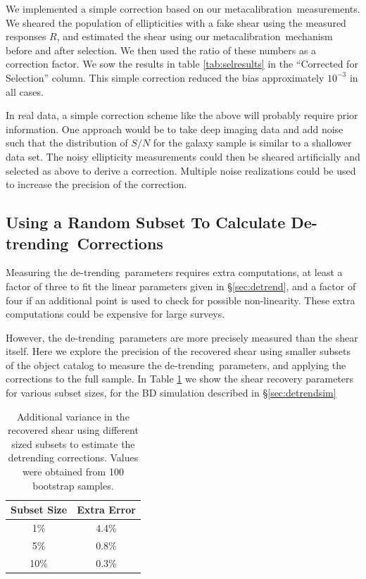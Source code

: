 \documentclass[usegraphicx,usenatbib]{mn2e}
\newcommand{\mcal}{metacalibration}
\newcommand{\mcalR}{$R$}
\newcommand{\detrend}{de-trending}
\newcommand{\Detrend}{De-trending}
\begin{document}
We implemented a simple correction based on our \mcal\ measurements.  We
sheared the population of ellipticities with a fake shear using the measured
responses \mcalR, and estimated the shear using our \mcal\ mechanism before and
after selection.  We then used the ratio of these numbers as a correction
factor.  We sow the results in table \ref{tab:selresults} in the ``Corrected
for Selection'' column.  This simple correction reduced the bias approximately
$10^{-3}$ in all cases.

In real data, a simple correction scheme like the above will probably require
prior information.  One approach would be to take deep imaging data and add
noise such that the distribution of $S/N$ for the galaxy sample is similar to a
shallower data set.  The noisy ellipticity measurements could then be sheared
artificially and selected as above to derive a correction.  Multiple noise
realizations could be used to increase the precision of the correction.


\subsection{Using a Random Subset To Calculate \Detrend\ Corrections}

Measuring the \detrend\ parameters requires extra computations, at least a
factor of three to fit the linear parameters given in \S \ref{sec:detrend}, and
a factor of four if an additional point is used to check for possible
non-linearity. These extra computations could be expensive for large surveys.  

However, the \detrend\ parameters are more precisely measured than the shear
itself.  Here we explore the precision of the recovered shear using smaller
subsets of the object catalog to measure the \detrend\ parameters, and
applying the corrections to the full sample.  In Table \ref{tab:subsets}
we show the shear recovery parameters for various subset sizes, for the
BD simulation described in \S \ref{sec:detrendsim}

\begin{table}
    \centering
    \caption{Additional variance in the recovered shear 
        using different sized subsets to
        estimate the detrending corrections.  Values were obtained
        from 100 bootstrap samples. \label{tab:subsets}}
    \begin{tabular}{| c | c |}
        Subset Size & Extra Error \\
        \hline
        1\% & 4.4\% \\
        5\% & 0.8\% \\
        10\% & 0.3\% \\
    \end{tabular}
\end{table}
\end{document}
